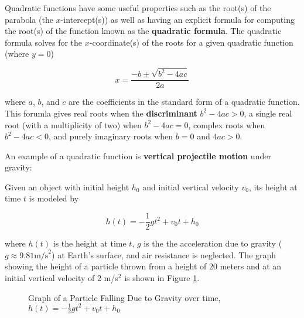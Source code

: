 Quadratic functions have some useful properties such as the root(s) of the parabola (the $x$-intercept(s)) as well as having an explicit formula for computing the root(s) of the function known as the \textbf{quadratic formula}. The quadratic formula solves for the $x$-coordinate(s) of the roots for a given quadratic function (where $y=0$)

\begin{equation}
    x = \frac{-b \pm \sqrt{b^2 - 4ac}}{2a}
\end{equation}

\noindent where $a$, $b$, and $c$ are the coefficients in the standard form of a quadratic function. This forumla gives real roots when the \textbf{discriminant} $b^2 - 4ac > 0$, a single real root (with a multiplicity of two) when $b^2 - 4ac = 0$, complex roots when $b^2 - 4ac < 0$, and purely imaginary roots when $b = 0$ and $4ac > 0$.

\begin{example}
    An example of a quadratic function is \textbf{vertical projectile motion} under gravity:

    \noindent Given an object with initial height $h_0$ and initial vertical velocity $v_0$, its height at time $t$ is modeled by

    $$
    h(t) = -\frac{1}{2}gt^2 + v_0 t + h_0
    $$

    \noindent where $h(t)$ is the height at time $t$, $g$ is the the acceleration due to gravity ($g \approx 9.81 \text{m/s}^2$) at Earth's surface, and air resistance is neglected. The graph showing the height of a particle thrown from a height of $20$ meters and at an initial vertical velocity of $2$ m/s$^2$ is shown in Figure \ref{ballistictrajectory}.

    \begin{figure}[!ht]
        \centering
        \label{ballistictrajectory}
        \caption{Graph of a Particle Falling Due to Gravity over time, $h(t) = -\frac{1}{2}gt^2 + v_0 t + h_0$}
    \end{figure}
\end{example}

